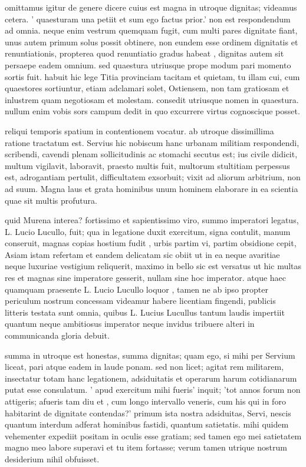  omittamus igitur de genere dicere cuius est magna in utroque dignitas; videamus cetera. ' quaesturam una petiit et sum ego factus prior.' non est respondendum ad omnia. neque enim vestrum quemquam fugit, cum multi pares dignitate fiant, unus autem primum solus possit obtinere, non eundem esse ordinem dignitatis et renuntiationis, propterea quod renuntiatio gradus habeat , dignitas autem sit persaepe eadem omnium. sed quaestura utriusque prope modum pari momento sortis fuit. habuit hic lege Titia provinciam tacitam et quietam, tu illam cui, cum quaestores sortiuntur, etiam adclamari solet, Ostiensem, non tam gratiosam et inlustrem quam negotiosam et molestam. consedit utriusque nomen in quaestura. nullum enim vobis sors campum dedit in quo excurrere virtus cognoscique posset.

 reliqui temporis spatium in contentionem vocatur. ab utroque dissimillima ratione tractatum est. Servius hic nobiscum hanc urbanam militiam respondendi, scribendi, cavendi plenam sollicitudinis ac stomachi secutus est; ius civile didicit, multum vigilavit, laboravit, praesto multis fuit, multorum stultitiam perpessus est, adrogantiam pertulit, difficultatem exsorbuit; vixit ad aliorum arbitrium, non ad suum. Magna laus et grata hominibus unum hominem elaborare in ea scientia quae sit multis profutura.

 quid Murena interea? fortissimo et sapientissimo viro, summo imperatori legatus, L. Lucio Lucullo, fuit; qua in legatione duxit exercitum, signa contulit, manum conseruit, magnas copias hostium fudit , urbis partim vi, partim obsidione cepit, Asiam istam refertam et eandem delicatam sic obiit ut in ea neque avaritiae neque luxuriae vestigium reliquerit, maximo in bello sic est versatus ut hic multas res et magnas sine imperatore gesserit, nullam sine hoc imperator. atque haec quamquam praesente L. Lucio Lucullo loquor , tamen ne ab ipso propter periculum nostrum concessam videamur habere licentiam fingendi, publicis litteris testata sunt omnia, quibus L. Lucius Lucullus tantum laudis impertiit quantum neque ambitiosus imperator neque invidus tribuere alteri in communicanda gloria debuit.

 summa in utroque est honestas, summa dignitas; quam ego, si mihi per Servium liceat, pari atque eadem in laude ponam. sed non licet; agitat rem militarem, insectatur totam hanc legationem, adsiduitatis et operarum harum cotidianarum putat esse consulatum. ' apud exercitum mihi fueris' inquit; 'tot annos forum non attigeris; afueris tam diu et , cum longo intervallo veneris, cum his qui in foro habitarint de dignitate contendas?' primum ista nostra adsiduitas, Servi, nescis quantum interdum adferat hominibus fastidi, quantum satietatis. mihi quidem vehementer expediit positam in oculis esse gratiam; sed tamen ego mei satietatem magno meo labore superavi et tu item fortasse; verum tamen utrique nostrum desiderium nihil obfuisset.

